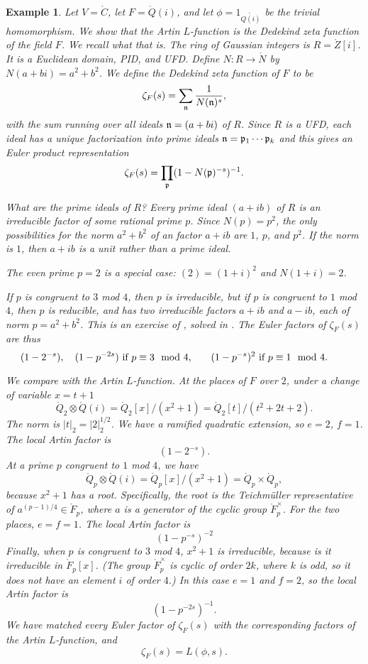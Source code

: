 \documentclass{amsart}
\newtheorem{example}[exercise]{Example}
\begin{document}
\begin{example}
Let $V=\ring{C}$, let $F=\ring{Q}(i)$, and let $\phi=1_{\ring{Q(i)}}$ be the trivial
homomorphism.  We show that the Artin $L$-function is the Dedekind zeta
function of the field $F$.  We recall what that is.
The ring of Gaussian integers is $R=\ring{Z}[i]$.  It is a Euclidean domain,
PID, and UFD.  Define $N:R\to\ring{N}$ by $N(a+b i)=a^2 + b^2$.
We define the Dedekind zeta function of $F$ to be
\[
\zeta_F(s) = \sum_{\frak n} \frac{1}{N(\frak n)^s},
\]
with the sum running over all ideals ${\frak n} = (a+b i)$ of $R$. 
Since $R$ is a UFD, each ideal has a unique factorization into prime ideals
${\frak n} = {\frak p}_1\cdots {\frak p}_k$ and this gives an Euler product
representation
\[
\zeta_F(s) = \prod_{\frak p} (1- N({\frak p})^{-s})^{-1}.
\]

What are the prime ideals of $R$?  
Every prime ideal $(a+ib)$ 
of $R$ is an irreducible factor of some rational prime $p$.
Since $N(p) = p^2$, the only possibilities
for the norm $a^2+b^2$ of an factor $a+ib$ are $1$, $p$, and $p^2$.  If the
norm is $1$, then $a+ib$ is a unit rather than a prime ideal.

The even prime $p=2$ is a special case: $(2) = (1+i)^2$ and $N(1+i)=2$.  

If $p$ is congruent to $3$ mod $4$, then $p$ is irreducible,
but if $p$ is congruent to $1$ mod $4$, then $p$ is reducible, and
has two irreducible factors $a+ib$ and $a-ib$, each of norm $p=a^2+b^2$.
This is an exercise of \cite[p.~443]{knapp-basic}, solved in \cite{DF}.
The Euler factors of $\zeta_F(s)$ are thus
\[
(1-2^{-s}),\quad (1-p^{-2s}) \text{ if $p\equiv 3 \mod 4$,}
\quad\quad (1-p^{-s})^2 \text{ if $p\equiv 1 \mod 4$.\quad\quad}
\]

We compare with the Artin $L$-function.  At the places of $F$ over $2$,
under a change of variable $x = t+1$
\[
\ring{Q}_2 \otimes \ring{Q}(i) = \ring{Q}_2[x]/(x^2+1) 
= \ring{Q}_2[t]/(t^2 + 2t + 2).
\]
The norm is $|t|_2 = |2|_2^{1/2}$.  We have a ramified quadratic
extension, so $e=2$, $f=1$.  The local Artin factor is
\[
(1-2^{-s}).
\]
At a prime $p$ congruent to $1$ mod $4$, we have
\[
\ring{Q}_p \otimes \ring{Q}(i) = \ring{Q}_p[x]/(x^2+1) = \ring{Q}_p\times \ring{Q}_p,
\]
because $x^2+1$ has a root.  Specifically, the root is the Teichm\"uller representative of
$a^{(p-1)/4}\in \ring{F}_p$, where $a$ is a generator of the cyclic
group $\ring{F}^\times_p$.  For the two places, $e=f=1$.  The local
Artin factor is
\[
(1-p^{-s})^{-2}
\]
Finally, when $p$ is congruent to $3$ mod $4$, $x^2+1$ is irreducible,
because is it irreducible in $\ring{F}_p[x]$.  (The group
$\ring{F}^\times_p$ is cyclic of order $2k$, where $k$ is odd, so it
does not have an element $i$ of order $4$.)  In this case $e=1$ and
$f=2$, so the local Artin factor is
\[
(1 - p^{-2s})^{-1}.
\]
We have matched every Euler factor of $\zeta_F(s)$ with the
corresponding factors of the Artin $L$-function, and
\[
\zeta_F(s) = L(\phi,s).
\]
\end{example}
\end{document}
